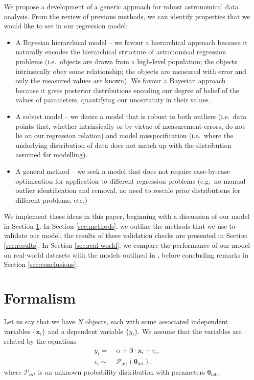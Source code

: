 \documentclass[fleqn,usenatbib]{mnras}
\begin{document}
We propose a development of a generic approach for robust astronomical data
analysis. From the review of previous methods, we can identify properties that
we would like to see in our regression model:

\begin{itemize}
	\item A Bayesian hierarchical model -- we favour a hierarchical approach
	because it naturally encodes the hierarchical structure of astronomical
	regression problems (i.e.\ objects are drawn from a high-level population;
	the objects intrinsically obey some relationship; the objects are measured
	with error and only the measured values are known). We favour a Bayesian
	approach because it gives posterior distributions encoding our degree of
	belief of the values of parameters, quantifying our uncertainty in their
	values.

	\item A robust model -- we desire a model that is robust to both outliers
	(i.e.\ data points that, whether intrinsically or by virtue of measurement
	errors, do not lie on our regression relation) and model misspecification
	(i.e.\ where the underlying distribution of data does not match up with the
	distribution assumed for modelling).

	\item A general method -- we seek a model that does not require case-by-case
	optimisation for application to different regression problems (e.g.\ no
	manual outlier identification and removal, no need to rescale prior
	distributions for different problems, etc.)
\end{itemize}

We implement these ideas in this paper, beginning with a discussion of our model
in Section \ref{sec:formalism}. In Section \ref{sec:methods}, we outline the
methods that we use to validate our model; the results of these validation
checks are presented in Section \ref{sec:results}. In Section
\ref{sec:real-world}, we compare the performance of our model on real-world
datasets with the models outlined in \citet{Kelly:2007, Park:2017}, before
concluding remarks in Section \ref{sec:conclusions}.

\section{Formalism}
\label{sec:formalism}

Let us say that we have $N$ objects, each with some associated independent
variables $\{\boldsymbol{x}_i\}$ and a dependent variable $\{y_i\}$. We assume
that the variables are related by the equations
\begin{align}
    y_i =&\; \alpha + \boldsymbol{\beta} \cdot \boldsymbol{x}_i + \epsilon_i, \\
    \epsilon_i \sim&\; \mathcal{P}_{\text{int}} \left( \boldsymbol{\theta}_{\text{int}} \right),
\end{align}
where $\mathcal{P}_{int}$ is an unknown probability distribution with parameters
$\boldsymbol{\theta}_{\text{int}}$.
\end{document}
